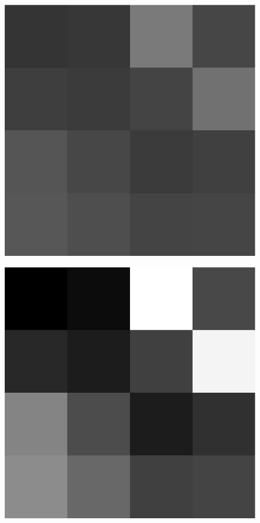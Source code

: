 \documentclass{article}
\begin{document}
\begin{figure}[ht]
\begin{minipage}[c]{.35\linewidth}
\begin{tabular}{c|c}
       \end{tabular}
    \label{esempio1}
    \end{minipage}%
    \begin{minipage}[c]{.3\linewidth}
    \centering
        \includegraphics[scale=0.25]{immSorg.jpg}
    \label{esempio2}
    \end{minipage}\hspace{20pt}
    \begin{minipage}[c]{.3\linewidth}
        \centering
            \includegraphics[scale=0.25]{immElab.jpg}
        \label{esempio3}
        \end{minipage}
    \end{figure}
\end{document}

